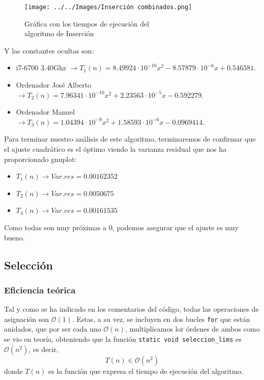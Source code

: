 \documentclass[10pt,a4paper]{article}
\begin{document}
\begin{figure}[h!]
	\centering
	\texttt{[image: ../../Images/Inserción combinados.png]}
	\caption{Gráfica con los tiempos de ejecución del \\algoritmo de Inserción}
\end{figure}

Y las constantes ocultas son:

\begin{itemize}
	\item i7-6700 3.40Ghz \(\rightarrow T_1(n) = 8.49924 \cdot 10^{-10} x^2 - 8.57879 \cdot 10^{-6} x + 0.546581\).
	\item Ordenador José Alberto \(\rightarrow T_2(n) = 7.96341 \cdot 10^{-10} x^2 + 2.23563 \cdot 10^{-5} x - 0.592279\).
	\item Ordenador Manuel \(\rightarrow T_3(n) = 1.04394 \cdot 10^{-9} x^2 + 1.58593 \cdot 10^{-6} x - 0.0969414\).
\end{itemize}

Para terminar nuestro análisis de este algoritmo, terminaremos de confirmar que el ajuste cuadrático es el óptimo viendo la varianza residual que nos ha proporcionado gnuplot:

\begin{itemize}
	\item \(T_1(n) \longrightarrow Var.res = 0.00162352\)
	\item \(T_2(n) \longrightarrow Var.res = 0.0050675\)
	\item \(T_3(n) \longrightarrow Var.res = 0.00161535\)
\end{itemize}

Como todas son muy próximas a 0, podemos asegurar que el ajuste es muy bueno.

\subsection{Selección}


\subsubsection{Eficiencia teórica}
Tal y como se ha indicado en los comentarios del código, todas las operaciones de asignación son \(\mathcal{O}(1)\). Estas, a su vez, se incluyen en dos bucles \texttt{for} que están anidados, que por ser cada uno \(\mathcal{O}(n)\), multiplicamos lor órdenes de ambos como se vio en teoría, obteniendo que la función \texttt{static void seleccion\_lims} es \(\mathcal{O}(n^2)\), es decir,
\[
T(n) \in \mathcal{O}(n^2)
\]
donde \(T(n)\) es la función que expresa el tiempo de ejecución del algoritmo.
\end{document}
